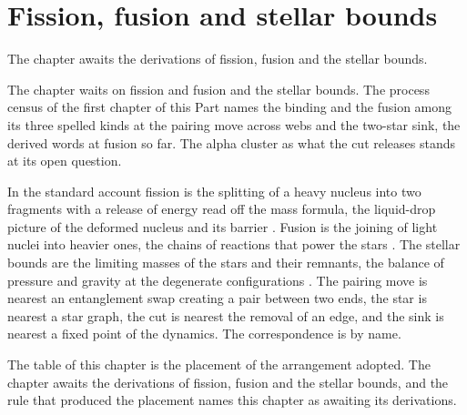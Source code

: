 \section{Fission, fusion and stellar bounds}\label{mod:IX-8-fission-fusion-and-stellar-bounds}
\begin{chtable}
The chapter awaits the derivations of fission, fusion and the stellar bounds.
\end{chtable}
\chdeps{}{}
The chapter waits on fission and fusion and the stellar bounds. The process census of the first chapter of this Part names the binding and the fusion among its three spelled kinds at the pairing move across webs and the two-star sink, the derived words at fusion so far. The alpha cluster as what the cut releases stands at its open question.
\begin{chbridge}
In the standard account fission is the splitting of a heavy nucleus into two fragments with a release of energy read off the mass formula, the liquid-drop picture of the deformed nucleus and its barrier \cite{BohrWheeler1939}. Fusion is the joining of light nuclei into heavier ones, the chains of reactions that power the stars \cite{Bethe1939}. The stellar bounds are the limiting masses of the stars and their remnants, the balance of pressure and gravity at the degenerate configurations \cite{Chandrasekhar1931}. The pairing move is nearest an entanglement swap creating a pair between two ends, the star is nearest a star graph, the cut is nearest the removal of an edge, and the sink is nearest a fixed point of the dynamics. The correspondence is by name.
\end{chbridge}
\begin{chproof}
The table of this chapter is the placement of the arrangement adopted. The chapter awaits the derivations of fission, fusion and the stellar bounds, and the rule that produced the placement names this chapter as awaiting its derivations.
\end{chproof}

